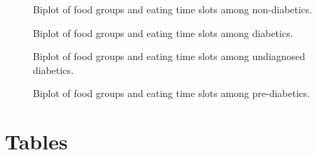 \documentclass{bmcart}
\begin{document}
\begin{backmatter}
\begin{figure}[h!]
  \caption{Biplot of food groups and eating time slots among non-diabetics.}
\end{figure}

\begin{figure}[h!]
	\caption{Biplot of food groups and eating time slots among diabetics.}
\end{figure}

\begin{figure}[h!]
	\caption{Biplot of food groups and eating time slots among undiagnosed diabetics.}
\end{figure}


\begin{figure}[h!]
	\caption{Biplot of food groups and eating time slots among pre-diabetics.}
\end{figure}



\section*{Tables}


\end{backmatter}
\end{document}
